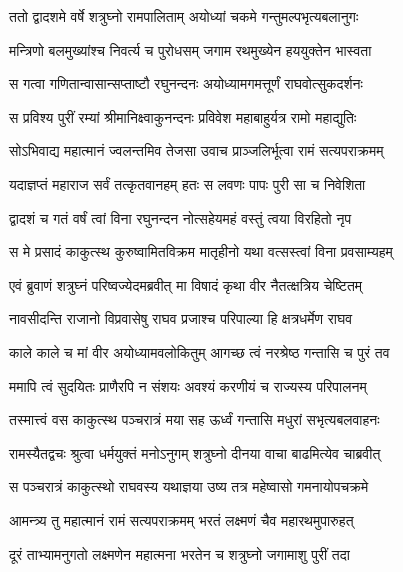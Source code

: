 
\twolineshloka
{ततो द्वादशमे वर्षे शत्रुघ्नो रामपालिताम्}
{अयोध्यां चकमे गन्तुमल्पभृत्यबलानुगः} %

\twolineshloka
{मन्त्रिणो बलमुख्यांश्च निवर्त्य च पुरोधसम्}
{जगाम रथमुख्येन हययुक्तेन भास्वता} %

\twolineshloka
{स गत्वा गणितान्वासान्सप्ताष्टौ रघुनन्दनः}
{अयोध्यामगमत्तूर्णं राघवोत्सुकदर्शनः} %

\twolineshloka
{स प्रविश्य पुरीं रम्यां श्रीमानिक्ष्वाकुनन्दनः}
{प्रविवेश महाबाहुर्यत्र रामो महाद्युतिः} %

\twolineshloka
{सोऽभिवाद्य महात्मानं ज्वलन्तमिव तेजसा}
{उवाच प्राञ्जलिर्भूत्वा रामं सत्यपराक्रमम्} %

\twolineshloka
{यदाज्ञप्तं महाराज सर्वं तत्कृतवानहम्}
{हतः स लवणः पापः पुरी सा च निवेशिता} %

\twolineshloka
{द्वादशं च गतं वर्षं त्वां विना रघुनन्दन}
{नोत्सहेयमहं वस्तुं त्वया विरहितो नृप} %

\twolineshloka
{स मे प्रसादं काकुत्स्थ कुरुष्वामितविक्रम}
{मातृहीनो यथा वत्सस्त्वां विना प्रवसाम्यहम्} %

\twolineshloka
{एवं ब्रुवाणं शत्रुघ्नं परिष्वज्येदमब्रवीत्}
{मा विषादं कृथा वीर नैतत्क्षत्रिय चेष्टितम्} %

\twolineshloka
{नावसीदन्ति राजानो विप्रवासेषु राघव}
{प्रजाश्च परिपाल्या हि क्षत्रधर्मेण राघव} %

\twolineshloka
{काले काले च मां वीर अयोध्यामवलोकितुम्}
{आगच्छ त्वं नरश्रेष्ठ गन्तासि च पुरं तव} %

\twolineshloka
{ममापि त्वं सुदयितः प्राणैरपि न संशयः}
{अवश्यं करणीयं च राज्यस्य परिपालनम्} %

\twolineshloka
{तस्मात्त्वं वस काकुत्स्थ पञ्चरात्रं मया सह}
{ऊर्ध्वं गन्तासि मधुरां सभृत्यबलवाहनः} %

\twolineshloka
{रामस्यैतद्वचः श्रुत्वा धर्मयुक्तं मनोऽनुगम्}
{शत्रुघ्नो दीनया वाचा बाढमित्येव चाब्रवीत्} %

\twolineshloka
{स पञ्चरात्रं काकुत्स्थो राघवस्य यथाज्ञया}
{उष्य तत्र महेष्वासो गमनायोपचक्रमे} %

\twolineshloka
{आमन्त्र्य तु महात्मानं रामं सत्यपराक्रमम्}
{भरतं लक्ष्मणं चैव महारथमुपारुहत्} %

\twolineshloka
{दूरं ताभ्यामनुगतो लक्ष्मणेन महात्मना}
{भरतेन च शत्रुघ्नो जगामाशु पुरीं तदा} %


